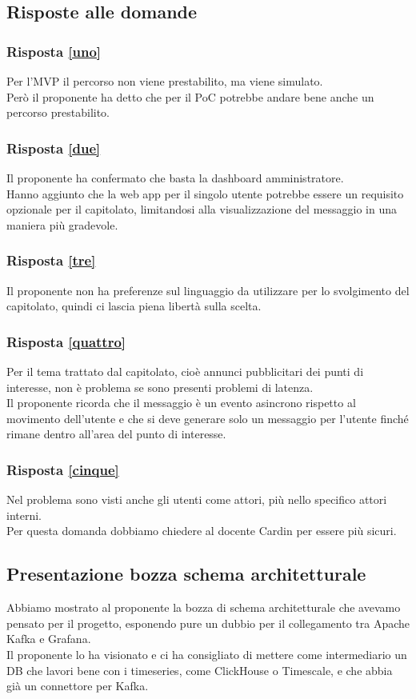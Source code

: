 \documentclass[12pt]{article}
\begin{document}
\subsection{Risposte alle domande}
\subsubsection{Risposta \ref{uno}}
Per l'MVP il percorso non viene prestabilito, ma viene simulato.\\
Però il proponente ha detto che per il PoC potrebbe andare bene anche un percorso prestabilito.
\subsubsection{Risposta \ref{due}}
Il proponente ha confermato che basta la dashboard amministratore.\\
Hanno aggiunto che la web app per il singolo utente potrebbe essere un requisito opzionale per il capitolato, limitandosi alla visualizzazione del messaggio in una maniera più gradevole.
\subsubsection{Risposta \ref{tre}}
Il proponente non ha preferenze sul linguaggio da utilizzare per lo svolgimento del capitolato, quindi ci lascia piena libertà sulla scelta.\\
\subsubsection{Risposta \ref{quattro}}
Per il tema trattato dal capitolato, cioè annunci pubblicitari dei punti di interesse, non è problema se sono presenti problemi di latenza.\\
Il proponente ricorda che il messaggio è un evento asincrono rispetto al movimento dell'utente e che si deve generare solo un messaggio per l'utente finché rimane dentro all'area del punto di interesse.
\subsubsection{Risposta \ref{cinque}}
Nel problema sono visti anche gli utenti come attori, più nello specifico attori interni.\\
Per questa domanda dobbiamo chiedere al docente Cardin per essere più sicuri.

\subsection{Presentazione bozza schema architetturale}
Abbiamo mostrato al proponente la bozza di schema architetturale che avevamo pensato per il progetto, esponendo pure un dubbio per il collegamento tra Apache Kafka e Grafana.\\
Il proponente lo ha visionato e ci ha consigliato di mettere come intermediario un DB che lavori bene con i timeseries, come ClickHouse o Timescale, e che abbia già un connettore per Kafka.
\end{document}
